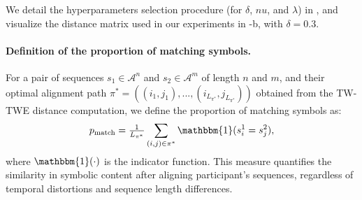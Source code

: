 \begin{chapterabstract}
        We detail the hyperparameters selection procedure (for $\delta$, $nu$, and $\lambda$) in , and visualize the distance matrix used in our experiments in -b, with $\delta=0.3$.



        \paragraph{Definition of the proportion of matching symbols.\\}
            For a pair of sequences $s_1 \in \mathcal{A}^n$ and $s_2 \in \mathcal{A}^m$ of length $n$ and $m$, and their optimal alignment path $\pi^* = ((i_1,j_1),...,(i_{L_{\pi^*}},j_{L_{\pi^*}}))$ obtained from the TW-TWE distance computation, we define the proportion of matching symbols as:
            \[
            p_{\text{match}} = \tfrac{1}{L_{\pi^*}} \sum_{(i,j) \in \pi^*} \mathbbm{1}(s^1_i = s^2_j),
            \]
            where $\mathbbm{1}(\cdot)$ is the indicator function. This measure quantifies the similarity in symbolic content after aligning participant's sequences, regardless of temporal distortions and sequence length differences. %


\end{chapterabstract}
